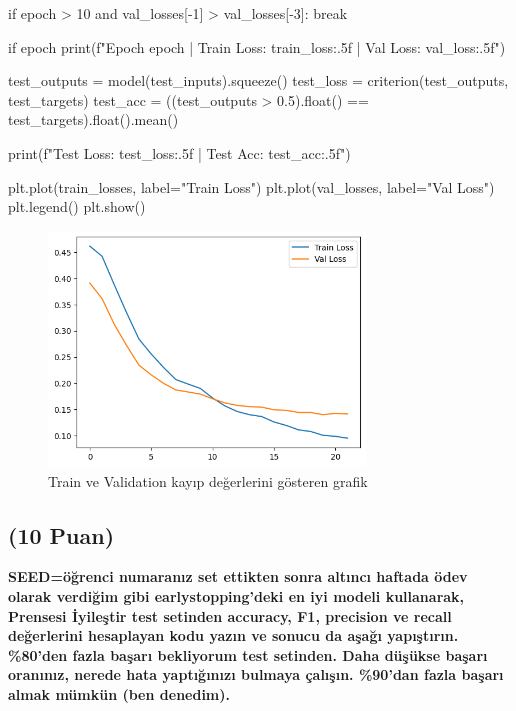 \documentclass[11pt]{article}
\begin{document}
\begin{python}
    
    if epoch > 10 and val_losses[-1] > val_losses[-3]:
        break

    
    if epoch %
        print(f"Epoch {epoch} | Train Loss: {train_loss:.5f} | Val Loss: {val_loss:.5f}")



test_outputs = model(test_inputs).squeeze()
test_loss = criterion(test_outputs, test_targets)
test_acc = ((test_outputs > 0.5).float() == test_targets).float().mean()

print(f"Test Loss: {test_loss:.5f} | Test Acc: {test_acc:.5f}")

plt.plot(train_losses, label="Train Loss")
plt.plot(val_losses, label="Val Loss")
plt.legend()
plt.show()
\end{python}


\begin{figure}[ht!]
    \centering
    \includegraphics[width=0.75\textwidth]{resim1.png}
    \caption{Train ve Validation kayıp değerlerini gösteren grafik}
    \label{fig:my_pic}
\end{figure}
\newpage

\subsection{(10 Puan)} \textbf{SEED=öğrenci numaranız set ettikten sonra altıncı haftada ödev olarak verdiğim gibi earlystopping'deki en iyi modeli kullanarak, Prensesi İyileştir test setinden accuracy, F1, precision ve recall değerlerini hesaplayan kodu yazın ve sonucu da aşağı yapıştırın. \%80'den fazla başarı bekliyorum test setinden. Daha düşükse başarı oranınız, nerede hata yaptığınızı bulmaya çalışın. \%90'dan fazla başarı almak mümkün (ben denedim).}
\end{document}
